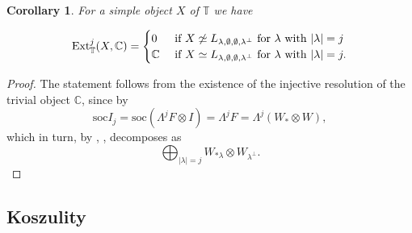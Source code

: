 \documentclass[11pt]{article}
\theoremstyle{plain}
\newtheorem{corollary}[lemma]{Corollary}
\theoremstyle{nonumberplain}
\theoremstyle{plain}
\numberwithin{equation}{section}
\theoremstyle{nonumberplain}
\newtheorem{proof}{Proof}
\newcommand\bC{{\mathbb C}}
\newcommand\bT{{\mathbb T}}
\newcommand\1{{\bf 1}}
\begin{document}
\begin{corollary}\label{cor.c}
For a simple object $X$ of $\bT$ we have  

\begin{equation*}
\operatorname{Ext}_{\bT}^{j}(X,\bC)=
 \begin{cases}
  0& \textup{ if } X \not\simeq  L_{\lambda,\emptyset,\emptyset,{\lambda^\perp}} \textup{ for }\lambda \textup{ with } |\lambda|=j\\
\mathbb{C}& \textup{ if } X \simeq  L_{\lambda,\emptyset,\emptyset,{\lambda^\perp}}  \textup{ for }\lambda \textup{ with } |\lambda|=j.


 \end{cases}
\end{equation*}
\end{corollary}
\begin{proof}
  The statement follows from the existence of the injective resolution  of the trivial object $\bC$, since by   \begin{equation*}
  \mathrm{soc}I_j=\mathrm{soc}(\Lambda^j F\otimes I)=\Lambda^j F = \Lambda^j(W_*\otimes W),
  \end{equation*}
 which in turn, by , , decomposes as
   \begin{equation*}
  \bigoplus_{|\lambda|=j}W_{*\lambda}\otimes W_{\lambda^{\perp}}. 
  \end{equation*}
  
\end{proof}

\subsection{Koszulity}\label{subse:kosz}
\end{document}
